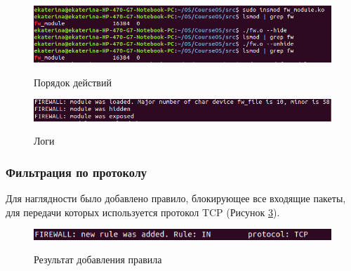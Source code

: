 \begin{figure}[h]
	\begin{center}
		{\includegraphics[scale = 0.6]{img/screenshots/hide_unhide/hide_comm.png}}
		\caption{Порядок действий}
		\label{fig12:image}
	\end{center}
\end{figure}

\begin{figure}[h]
	\begin{center}
		{\includegraphics[scale = 0.7]{img/screenshots/hide_unhide/hide_result.png}}
		\caption{Логи}
		\label{fig13:image}
	\end{center}
\end{figure}

\subsubsection{Фильтрация по протоколу}
Для наглядности было добавлено правило, блокирующее все входящие пакеты, для передачи которых используется протокол TCP (Рисунок \ref{fig14:image}).
\begin{figure}[h]
	\begin{center}
		{\includegraphics[scale = 0.7]{img/screenshots/rule_protocol/log_add_rule.png}}
		\caption{Результат добавления правила}
		\label{fig14:image}
	\end{center}
\end{figure}

